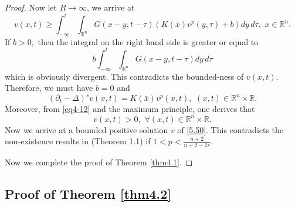 \documentclass[12pt]{article}
\theoremstyle{remark}
\numberwithin{equation}{section}
\newcommand{\R}{\mathbb{R}}
\begin{document}
\begin{proof}
Now let $R \to \infty$, we arrive at
$$
v(x,t)\geq \int_{-\infty}^t \int_{\mathbb{R}^n} G(x-y, t-\tau) \left(K(\bar x) v^p(y, \tau)+b \right)dy \, d \tau, \,\, x \in \mathbb{R}^n.
$$
If $b>0,$ then the integral on the right hand side is greater or equal to
$$ b \int_{-\infty}^t \int_{\mathbb{R}^n} G(x-y, t-\tau) dy \, d \tau$$
which is obviously divergent. This contradicts the bounded-ness of $v(x,t)$.
Therefore, we must have $b=0$ and
\begin{equation} \label{5.50}
(\partial_t-\Delta)^s v(x,t)=K(\bar x) v^p(x,t),\,\, (x,t) \in \mathbb{R}^n \times \R.
\end{equation}
Moreover, from \eqref{eq4-12} and  the maximum principle,
one derives that
$$v(x,t)>0,\,\, \forall (x,t) \in \mathbb{R}^n \times \R.$$
Now we arrive at a bounded positive solution $v$ of \eqref{5.50}. This contradicts the non-existence results in \cite{FP} (Theorem 1.1) if $1< p < \frac{n+2}{n+2-2s}$.

Now we  complete the proof of Theorem \ref{thm4.1}.

\end{proof}

\subsection{Proof of Theorem \ref{thm4.2}}
\end{document}
